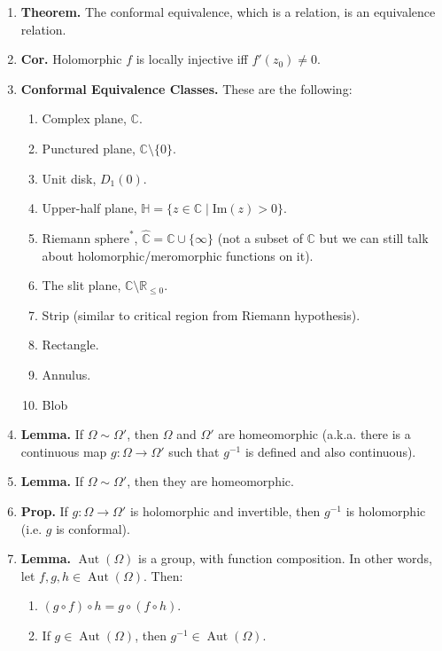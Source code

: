\documentclass[10pt]{article}
\theoremstyle{definition}
\theoremstyle{named}
\DeclareMathOperator{\Aut}{Aut}
\begin{document}
\begin{enumerate}
\begin{enumerate}
    \end{enumerate}
    \item \textbf{Theorem. } The conformal equivalence, which is a relation, is an equivalence relation. 
    \item \textbf{Cor. } Holomorphic $f$ is locally injective iff $f'(z_0) \neq 0$.  
    \item \textbf{Conformal Equivalence Classes. } These are the following: 
    \begin{enumerate}
        \item Complex plane, $\mathbb{C}$. 
        \item Punctured plane, $\mathbb{C} \setminus \{0\}$. 
        \item Unit disk, $D_1(0)$. 
        \item Upper-half plane, $\mathbb{H} = \{z \in \mathbb{C} \mid \textrm{Im}(z) > 0\}$. 
        \item $\textrm{Riemann sphere}^*$, $\hat{\mathbb{C}} = \mathbb{C} \cup \{\infty\}$ (not a subset of $\mathbb{C}$ but we can still talk about holomorphic/meromorphic functions on it). 
        \item The slit plane, $\mathbb{C} \setminus \mathbb{R}_{\leq 0}$. 
        \item Strip (similar to critical region from Riemann hypothesis). 
        \item Rectangle. 
        \item Annulus. 
        \item Blob
    \end{enumerate}
    \item \textbf{Lemma. } If $\Omega \sim \Omega'$, then $\Omega$ and $\Omega'$ are homeomorphic (a.k.a. there is a continuous map $g: \Omega \to \Omega'$ such that $g^{-1}$ is defined and also continuous). 
    \item \textbf{Lemma. } If $\Omega \sim \Omega'$, then they are homeomorphic. 
    \item \textbf{Prop. } If $g: \Omega \to \Omega'$ is holomorphic and invertible, then $g^{-1}$ is holomorphic (i.e. $g$ is conformal). 
    \item \textbf{Lemma. } $\Aut(\Omega)$ is a group, with function composition. In other words, let $f,g,h \in \Aut(\Omega)$. Then: 
    \begin{enumerate}
        \item $(g \circ f) \circ h = g \circ (f \circ h)$. 
        \item If $g \in \Aut(\Omega)$, then $g^{-1} \in \Aut(\Omega)$. 

\end{enumerate}
\end{enumerate}
\end{document}
